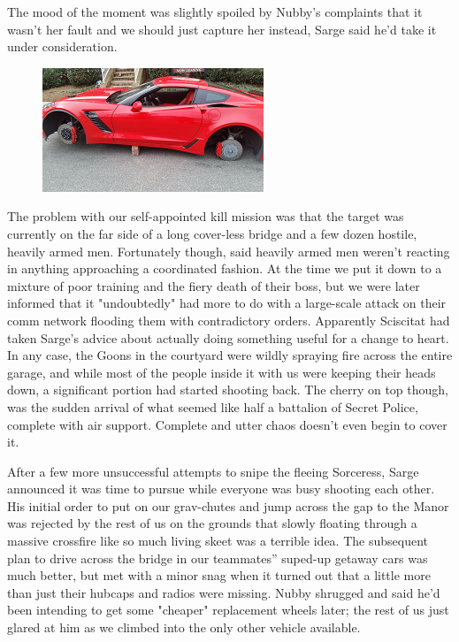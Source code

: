 The mood of the moment was slightly spoiled by Nubby's complaints that it wasn't her fault and we should just capture her instead, Sarge said he'd take it under consideration.

\begin{figure}
	\begin{center}
		\includegraphics[width=\figwidth]{pics/18/55.png}
	\end{center}
\end{figure}
The problem with our self-appointed kill mission was that the target was currently on the far side of a long cover-less bridge and a few dozen hostile, heavily armed men. 
Fortunately though, said heavily armed men weren't reacting in anything approaching a coordinated fashion. 
At the time we put it down to a mixture of poor training and the fiery death of their boss, but we were later informed that it "undoubtedly" had more to do with a large-scale attack on their comm network flooding them with contradictory orders. 
Apparently Sciscitat had taken Sarge's advice about actually doing something useful for a change to heart. 
In any case, the Goons in the courtyard were wildly spraying fire across the entire garage, and while most of the people inside it with us were keeping their heads down, a significant portion had started shooting back. 
The cherry on top though, was the sudden arrival of what seemed like half a battalion of Secret Police, complete with air support. 
Complete and utter chaos doesn't even begin to cover it.

After a few more unsuccessful attempts to snipe the fleeing Sorceress, Sarge announced it was time to pursue while everyone was busy shooting each other. 
His initial order to put on our grav-chutes and jump across the gap to the Manor was rejected by the rest of us on the grounds that slowly floating through a massive crossfire like so much living skeet was a terrible idea. 
The subsequent plan to drive across the bridge in our teammates'' suped-up getaway cars was much better, but met with a minor snag when it turned out that a little more than just their hubcaps and radios were missing. 
Nubby shrugged and said he'd been intending to get some "cheaper" replacement wheels later; 
the rest of us just glared at him as we climbed into the only other vehicle available.

